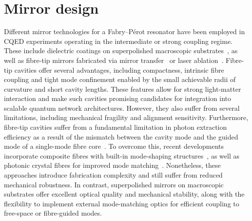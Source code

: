 \documentclass[../Thesis-IJspeert.tex]{subfiles}
\begin{document}
\section{Mirror design}
\label{mirrordesign}
Different mirror technologies for a Fabry--Pérot resonator have been employed in CQED experiments operating in the intermediate or strong coupling regime. These include dielectric coatings on superpolished macroscopic substrates~\cite{Casabone2013, Reimann2015, Welte2017}, as well as fibre-tip mirrors fabricated via mirror transfer~\cite{Steinmetz2006} or  laser ablation~\cite{Hunger2010}. Fibre-tip cavities offer several advantages, including compactness, intrinsic fibre coupling and tight mode confinement enabled by the small achievable radii of curvature and short cavity lengths. These features allow for strong light-matter interaction and make such cavities promising candidates for integration into scalable quantum network architectures. However, they also suffer from several limitations, including mechanical fragility and alignment sensitivity. Furthermore, fibre-tip cavities suffer from a fundamental limitation in photon extraction efficiency as a result of the mismatch between the cavity mode and the guided mode of a single-mode fibre core~\cite{Gallego2016}. To overcome this, recent developments incorporate composite fibres with built-in mode-shaping structures~\cite{Gulati2017}, as well as photonic crystal fibres for improved mode matching~\cite{Ott2016}. Nonetheless, these approaches introduce fabrication complexity and still suffer from reduced mechanical robustness. In contrast, superpolished mirrors on macroscopic substrates offer excellent optical quality and mechanical stability, along with the flexibility to implement external mode-matching optics for efficient coupling to free-space or fibre-guided modes.
\end{document}

